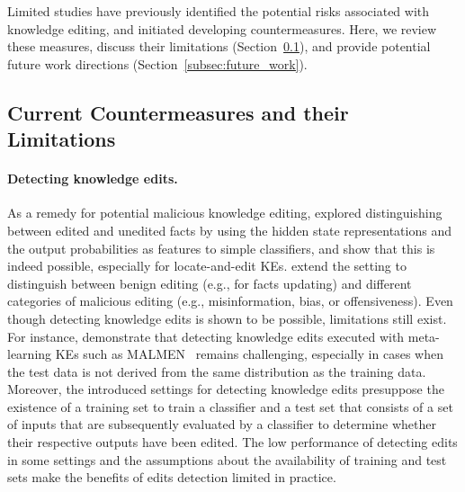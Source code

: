 Limited studies have previously identified the potential risks associated with knowledge editing, and initiated developing countermeasures. Here, we review these measures, discuss their limitations (Section~\ref{subsec:current}), and provide potential future work directions (Section~\ref{subsec:future_work}).

\subsection{Current Countermeasures and their Limitations}
\label{subsec:current}

\paragraph{Detecting knowledge edits.} As a remedy for potential malicious knowledge editing, \citet{youssef-etal-2024-detecting} explored distinguishing between edited and unedited facts by using the hidden state representations and the output probabilities as features to simple classifiers, and show that this is indeed possible, especially for locate-and-edit KEs. \citet{li2024identifying} extend the setting to distinguish between benign editing (e.g., for facts updating) and different categories of malicious editing (e.g., misinformation, bias, or offensiveness). Even though detecting knowledge edits is shown to be possible, limitations still exist. For instance, \citet{youssef-etal-2024-detecting} demonstrate that detecting knowledge edits executed with meta-learning KEs such as MALMEN~\cite{tan23malmen} remains challenging, especially in cases when the test data is not derived from the same distribution as the training data. Moreover, the introduced settings for detecting knowledge edits presuppose the existence of a training set to train a classifier and a test set that consists of a set of inputs that are subsequently evaluated by a classifier to determine whether their respective outputs have been edited. The low performance of detecting edits in some settings and the assumptions about the availability of training and test sets make the benefits of edits detection limited in practice. 

